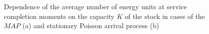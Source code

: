 \documentclass[12pt, a4paper]{article}
\begin{document}
\begin{figure}[h]
\begin{minipage}[h]{0.49\linewidth}
\end{minipage}
\caption{Dependence of the average number of energy units  at service completion moments on the capacity $K$ of the stock
in cases of the $MAP$ (a) and stationary Poisson arrival process (b)}
\end{figure}


\begin{figure}[h]
\begin{minipage}[h]{0.49\linewidth}
\end{minipage}
\hfill
\begin{minipage}[h]{0.49\linewidth}

\end{minipage}
\end{figure}
\end{document}
